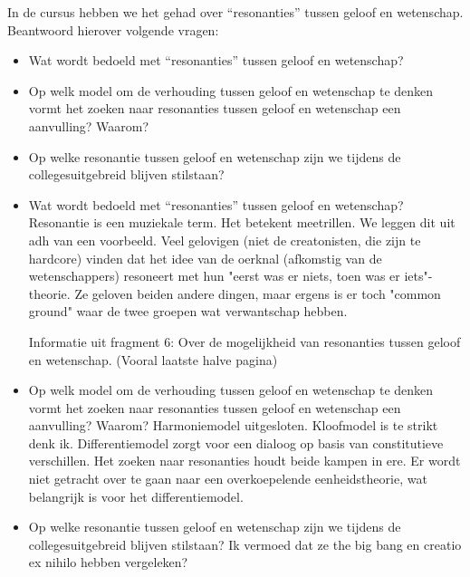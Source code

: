 \documentclass[main.tex]{subfiles}
\begin{document}
\begin{examenvraag}
    \begin{vraag}
        In de cursus hebben we het gehad over “resonanties” tussen geloof en wetenschap. Beantwoord hierover volgende vragen:
        \begin{itemize}
            \item Wat wordt bedoeld met “resonanties” tussen geloof en wetenschap?
            \item Op welk model om de verhouding tussen geloof en wetenschap te denken vormt het zoeken naar resonanties tussen geloof en wetenschap een aanvulling? Waarom?
            \item Op welke resonantie tussen geloof en wetenschap zijn we tijdens de collegesuitgebreid blijven stilstaan?
        \end{itemize}
    \end{vraag}

    \begin{antwoord}
    	\begin{itemize}
    		\item Wat wordt bedoeld met “resonanties” tussen geloof en wetenschap?
    			Resonantie is een muziekale term.
    			Het betekent meetrillen.
    			We leggen dit uit adh van een voorbeeld.
    			Veel gelovigen (niet de creatonisten, die zijn te hardcore) vinden dat het idee van de oerknal (afkomstig van de wetenschappers) resoneert met hun "eerst was er niets,  toen was er iets"-theorie. 
    			Ze geloven beiden andere dingen, maar ergens is er toch "common ground" waar de twee groepen wat verwantschap hebben. 
		
				Informatie uit fragment 6: Over de mogelijkheid van resonanties tussen geloof en wetenschap. (Vooral laatste halve pagina)    	

		 	\item Op welk model om de verhouding tussen geloof en wetenschap te denken vormt het zoeken naar resonanties tussen geloof en wetenschap een aanvulling? Waarom?
		 		Harmoniemodel uitgesloten. Kloofmodel is te strikt denk ik. Differentiemodel zorgt voor een dialoog op basis van constitutieve verschillen. 
		 		Het zoeken naar resonanties houdt beide kampen in ere. 
		 		Er wordt niet getracht over te gaan naar een overkoepelende eenheidstheorie, wat belangrijk is voor het differentiemodel.
		 		
		 	\item Op welke resonantie tussen geloof en wetenschap zijn we tijdens de collegesuitgebreid blijven stilstaan?
		 		Ik vermoed dat ze the big bang en creatio ex nihilo hebben vergeleken? 	
		 	\end{itemize}		
		
    \end{antwoord}
\end{examenvraag}
\end{document}
